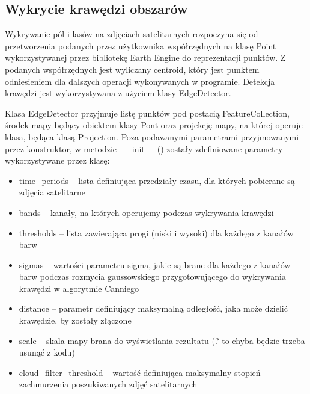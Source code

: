 \subsection{Wykrycie krawędzi obszarów}
Wykrywanie pól i lasów na zdjęciach satelitarnych rozpoczyna się od przetworzenia podanych przez użytkownika współrzędnych na klasę Point wykorzystywanej przez bibliotekę Earth Engine do reprezentacji punktów. Z podanych współrzędnych jest wyliczany centroid, który jest punktem odniesieniem dla dalszych operacji wykonywanych w programie. Detekcja krawędzi jest wykorzystywana z użyciem klasy EdgeDetector. 

Klasa EdgeDetector przyjmuje listę punktów pod postacią FeatureCollection, środek mapy będący obiektem klasy Pont oraz projekcję mapy, na której operuje klasa, będąca klasą Projection. Poza podawanymi parametrami przyjmowanymi przez konstruktor, w metodzie \_\_init\_\_() zostały zdefiniowane parametry wykorzystywane przez klasę:

\begin{itemize}
    \item time\_periods -- lista definiująca przedziały czasu, dla których pobierane są zdjęcia satelitarne
    \item bands -- kanały, na których operujemy podczas wykrywania krawędzi
    \item thresholds -- lista zawierająca progi (niski i wysoki) dla każdego z kanałów barw
    \item sigmas -- wartości parametru sigma, jakie są brane dla każdego z kanałów barw podczas rozmycia gaussowskiego przygotowującego do wykrywania krawędzi w algorytmie Canniego
    \item distance -- parametr definiujący maksymalną odległość, jaka może dzielić krawędzie, by zostały złączone
    \item scale -- skala mapy brana do wyświetlania rezultatu (? to chyba będzie trzeba usunąć z kodu)
    \item cloud\_filter\_threshold -- wartość definiująca maksymalny stopień zachmurzenia poszukiwanych zdjęć satelitarnych
\end{itemize}

